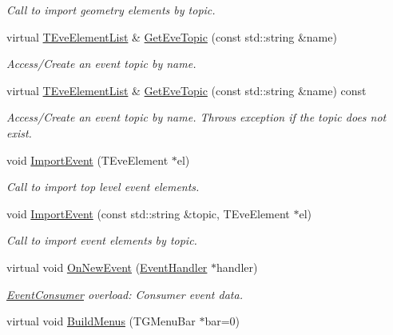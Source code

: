 \begin{DoxyCompactItemize}
\begin{DoxyCompactList}\small\item\em Call to import geometry elements by topic. \end{DoxyCompactList}\item 
virtual \hyperlink{class_t_eve_element_list}{T\+Eve\+Element\+List} \& \hyperlink{class_d_d4hep_1_1_display_afbc3b9ac94db611f0f0fd88dd323d650}{Get\+Eve\+Topic} (const std\+::string \&name)
\begin{DoxyCompactList}\small\item\em Access/\+Create an event topic by name. \end{DoxyCompactList}\item 
virtual \hyperlink{class_t_eve_element_list}{T\+Eve\+Element\+List} \& \hyperlink{class_d_d4hep_1_1_display_a521137252c2195c95b59c603dc227c8e}{Get\+Eve\+Topic} (const std\+::string \&name) const
\begin{DoxyCompactList}\small\item\em Access/\+Create an event topic by name. Throws exception if the topic does not exist. \end{DoxyCompactList}\item 
void \hyperlink{class_d_d4hep_1_1_display_a873232e99e43ac05e012104197a37777}{Import\+Event} (T\+Eve\+Element $\ast$el)
\begin{DoxyCompactList}\small\item\em Call to import top level event elements. \end{DoxyCompactList}\item 
void \hyperlink{class_d_d4hep_1_1_display_a2dbd6c9e66592998912f977eb2f9d04b}{Import\+Event} (const std\+::string \&topic, T\+Eve\+Element $\ast$el)
\begin{DoxyCompactList}\small\item\em Call to import event elements by topic. \end{DoxyCompactList}\item 
virtual void \hyperlink{class_d_d4hep_1_1_display_a6bde493af2434cc4d59fa8b6b0e58058}{On\+New\+Event} (\hyperlink{class_d_d4hep_1_1_event_handler}{Event\+Handler} $\ast$handler)
\begin{DoxyCompactList}\small\item\em \hyperlink{class_d_d4hep_1_1_event_consumer}{Event\+Consumer} overload\+: Consumer event data. \end{DoxyCompactList}\item 
virtual void \hyperlink{class_d_d4hep_1_1_display_a9b8dbd9769ea14b3489b481ae3361080}{Build\+Menus} (T\+G\+Menu\+Bar $\ast$bar=0)

\end{DoxyCompactItemize}
